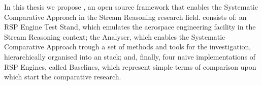 In this thesis we propose \namens, an open source framework that enables the Systematic Comparative Approach in the Stream Reasoning research field. \name consists of:  an RSP Engine Test Stand, which emulates the aerospace engineering facility in the Stream Reasoning context; the Analyser, which enables the Systematic Comparative Approach trough a set of methods and tools for the investigation, hierarchically organised into an stack; and, finally, four naive implementations of RSP Engines, called Baselines, which represent simple terms of comparison upon which  start the comparative research.